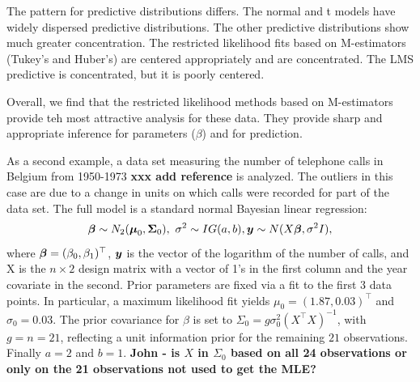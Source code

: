 \documentclass[ba]{imsart}
\def\bbeta{\mbox{\boldmath $\beta$}}
\newcommand{\by}{\mbox{\boldmath $y$}}
\begin{document}
The pattern for predictive distributions differs.  The normal and t models have widely dispersed predictive distributions.  The other predictive distributions show much greater concentration.  The restricted likelihood fits based on M-estimators (Tukey's and Huber's) are centered appropriately and are concentrated.  The LMS predictive is concentrated, but it is poorly centered.  

Overall, we find that the restricted likelihood methods based on M-estimators provide teh most attractive analysis for these data.  They provide sharp and appropriate inference for parameters ($\beta$) and for prediction.  

As a second example, a data set measuring the number of telephone calls in Belgium from 1950-1973 {\bf xxx add reference} is analyzed. The outliers in this case are due to a change in units on which calls were recorded for part of the data set. The full model is a standard normal Bayesian linear regression:
\begin{equation}
{\boldsymbol{\beta}}\sim N_{2}(\boldsymbol{\mu}_{0}, \boldsymbol{\Sigma}_{0}),\  \sigma^{2} \sim IG(a, b), \by \sim N(X\boldsymbol{\beta}, \sigma^{2} I),
\end{equation}
where $\bbeta = (\beta_{0}, \beta_{1})^{\top}$, $\by$ is the vector of the logarithm of the number of calls, and X is the $n\times 2$ design matrix with a vector of 1's in the first column and the year covariate in the second.  Prior parameters are fixed via a fit to the first 3 data points. In particular, a maximum likelihood fit yields $\mu_{0} = (1.87,  0.03)^{\top}$ and $\sigma_{0} = 0.03$.  The prior covariance for $\beta$ is set to $\Sigma_{0} = g\sigma_{0}^2 (X^{\top}X)^{-1}$, with $g=n=21$, reflecting a unit information prior \citep{kass1995reference} for the remaining $21$ observations. Finally $a = 2$ and $b =1$.
{\bf John - is $X$ in $\Sigma_0$ based on all 24 observations or only on the 21 observations not used to get the MLE?}
\end{document}
